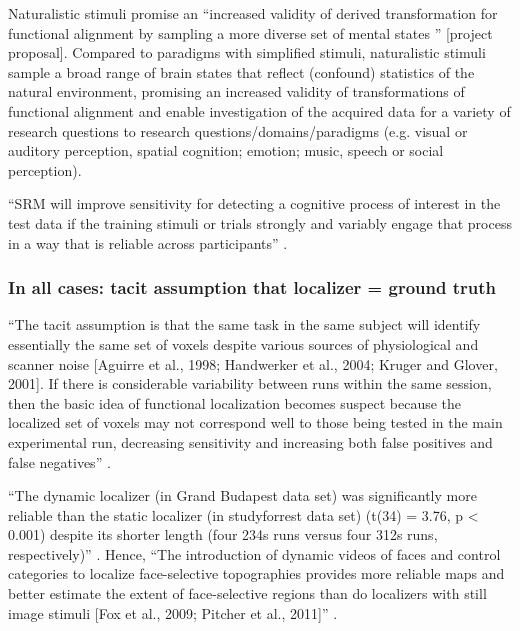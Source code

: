 %
Naturalistic stimuli promise an ``increased validity of derived transformation
for functional alignment by sampling a more diverse set of mental states  ''
[project proposal].
%
Compared to paradigms with simplified stimuli, naturalistic stimuli sample a
broad range of brain states \citep{guntupalli2016model, haxby2011common} that
reflect (confound) statistics of the natural environment, promising an increased
validity of transformations of functional alignment and enable investigation
of the acquired data for a variety of research questions to research
questions/domains/paradigms (e.g.  visual or auditory perception, spatial
cognition; emotion; music, speech or social perception).

%
``SRM will improve sensitivity for detecting a cognitive process of interest in
the test data if the training stimuli or trials strongly and variably engage
that process in a way that is reliable across participants''
\citep{cohen2017computational}.


\subsubsection{In all cases: tacit assumption that localizer = ground truth}


``The tacit assumption is that the same task in the same subject will identify
essentially the same set of voxels despite various sources of physiological and
scanner noise [Aguirre et al., 1998; Handwerker et al., 2004; Kruger and Glover,
2001].
%
If there is considerable variability between runs within the same session, then
the basic idea of functional localization becomes suspect because the localized
set of voxels may not correspond well to those being tested in the main
experimental run, decreasing sensitivity and increasing both false positives and
false negatives'' \citep{duncan2009consistency}.


``The dynamic localizer (in Grand Budapest data set) was significantly more
reliable than the static localizer (in studyforrest data set) (t(34) = 3.76, p <
0.001) despite its shorter length (four 234s runs versus four 312s runs,
respectively)'' \citep{jiahui2020predicting}.
%
Hence, ``The introduction of dynamic videos of faces and control categories to
localize face-selective topographies provides more reliable maps and better
estimate the extent of face-selective regions than do localizers with still
image stimuli [Fox et al., 2009; Pitcher et al., 2011]''
\citep{jiahui2020predicting}.


